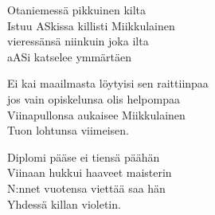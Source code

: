 Otaniemessä pikkuinen kilta\\
Istuu ASkissa killisti Miikkulainen\\
vieressänsä niinkuin joka ilta\\
aASi katselee ymmärtäen

Ei kai maailmasta löytyisi sen raittiinpaa\\
jos vain opiskelunsa olis helpompaa\\
Viinapullonsa aukaisee Miikkulainen\\
Tuon lohtunsa viimeisen.

Diplomi pääse ei tiensä päähän\\
Viinaan hukkui haaveet maisterin\\
N:nnet vuotensa viettää saa hän\\
Yhdessä killan violetin.